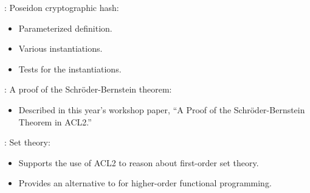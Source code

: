 
\begin{frame}

\newlibtitle

:
Poseidon cryptographic hash:
\begin{itemize}
\item Parameterized definition.
\item Various instantiations.
\item Tests for the instantiations.
\end{itemize}

\end{frame}


\begin{frame}

\newlibtitle

:
A proof of the Schr{\"o}der-Bernstein theorem:
\begin{itemize}
\item Described in this year's workshop paper,
      ``A Proof of the Schr{\"o}der-Bernstein Theorem in {ACL2}.''
\end{itemize}

\end{frame}


\begin{frame}

\newlibtitle

:
Set theory:
\begin{itemize}
\item Supports the use of ACL2 to reason about first-order set theory.
\item Provides an alternative to  for higher-order
      functional programming.
\end{itemize}

\end{frame}


